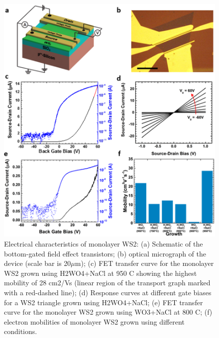 \begin{figure}[h]
\begin{center}
\includegraphics[scale=0.3]{PaperElectricalMeasurementMonolayer.png}
\caption{Electrical characteristics of monolayer WS2: (a) Schematic of the bottom-gated field effect transistors; (b) optical micrograph of the device (scale bar is 20${\mu}$m); (c) FET transfer curve for the monolayer WS2 grown using H2WO4+NaCl at 950 {\degree}C showing the highest mobility of 28 cm2/Vs (linear region of the transport graph marked with a red-dashed line); (d) Response curves at different gate biases for a WS2 triangle grown using H2WO4+NaCl; (e) FET transfer curve for the monolayer WS2 grown using WO3+NaCl at 800 {\degree}C; (f) electron mobilities of monolayer WS2 grown using different conditions.}
\label{fig:PaperElectricalMeasurementMonolayer}
\end{center}
\end{figure}

